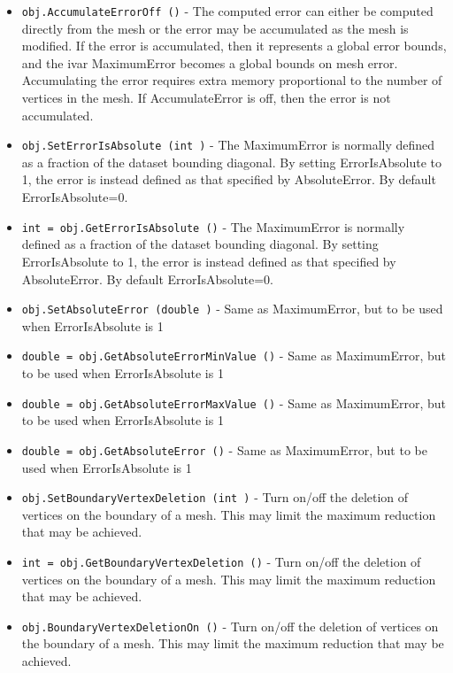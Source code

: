 \begin{itemize}
\item  \verb|obj.AccumulateErrorOff ()| -  The computed error can either be computed directly from the mesh
 or the error may be accumulated as the mesh is modified. If the error
 is accumulated, then it represents a global error bounds, and the ivar
 MaximumError becomes a global bounds on mesh error. Accumulating the
 error requires extra memory proportional to the number of vertices in
 the mesh. If AccumulateError is off, then the error is not accumulated.

\item  \verb|obj.SetErrorIsAbsolute (int )| -  The MaximumError is normally defined as a fraction of the dataset bounding
 diagonal. By setting ErrorIsAbsolute to 1, the error is instead defined
 as that specified by AbsoluteError. By default ErrorIsAbsolute=0.

\item  \verb|int = obj.GetErrorIsAbsolute ()| -  The MaximumError is normally defined as a fraction of the dataset bounding
 diagonal. By setting ErrorIsAbsolute to 1, the error is instead defined
 as that specified by AbsoluteError. By default ErrorIsAbsolute=0.

\item  \verb|obj.SetAbsoluteError (double )| -  Same as MaximumError, but to be used when ErrorIsAbsolute is 1

\item  \verb|double = obj.GetAbsoluteErrorMinValue ()| -  Same as MaximumError, but to be used when ErrorIsAbsolute is 1

\item  \verb|double = obj.GetAbsoluteErrorMaxValue ()| -  Same as MaximumError, but to be used when ErrorIsAbsolute is 1

\item  \verb|double = obj.GetAbsoluteError ()| -  Same as MaximumError, but to be used when ErrorIsAbsolute is 1

\item  \verb|obj.SetBoundaryVertexDeletion (int )| -  Turn on/off the deletion of vertices on the boundary of a mesh. This
 may limit the maximum reduction that may be achieved.

\item  \verb|int = obj.GetBoundaryVertexDeletion ()| -  Turn on/off the deletion of vertices on the boundary of a mesh. This
 may limit the maximum reduction that may be achieved.

\item  \verb|obj.BoundaryVertexDeletionOn ()| -  Turn on/off the deletion of vertices on the boundary of a mesh. This
 may limit the maximum reduction that may be achieved.


\end{itemize}

